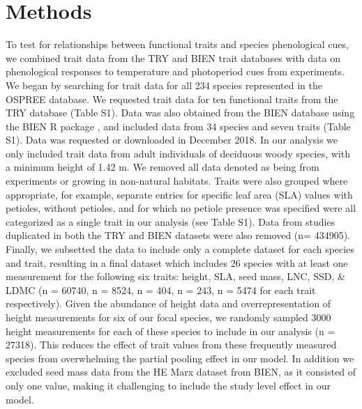 \documentclass{article}\usepackage[]{graphicx}\usepackage[]{color}
\begin{document}
\section{Methods}
To test for relationships between functional traits and species phenological cues, we combined trait data from the TRY and BIEN trait databases with data on phenological responses to temperature and photoperiod cues from experiments. We began by searching for trait data for all 234 species represented in the OSPREE database. We requested trait data for ten functional traits from the TRY database (Table S1). Data was also obtained from the BIEN database using the BIEN R package \citep{Maitner2017}, and included data from 34 species and seven traits (Table S1). Data was requested or downloaded in December 2018. In our analysis we only included trait data from adult individuals of deciduous woody species, with a minimum height of 1.42 m. We removed all data denoted as being from experiments or growing in non-natural habitats. Traits were also grouped where appropriate, for example, separate entries for specific leaf area (SLA) values with petioles, without petioles, and for which no petiole presence was specified were all categorized as a single trait in our analysis (see Table S1). Data from studies duplicated in both the TRY and BIEN datasets were also removed (n= 434905).  Finally, we subsetted the data to include only a complete dataset for each species and trait, resulting in a final dataset which includes 26 species with at least one measurement for the following six traits: height, SLA, seed mass, LNC, SSD, \& LDMC (n = 60740, n = 8524, n = 404, n = 243, n = 5474 for each trait respectively). Given the abundance of height data and overrepresentation of height measurements for six of our focal species, we randomly sampled 3000 height measurements for each of these species to include in our analysis (n = 27318). This reduces the effect of trait values from these frequently measured species from overwhelming the partial pooling effect in our model. In addition we excluded seed mass data from the HE Marx dataset from BIEN, as it consisted of only one value, making it challenging to include the study level effect in our model.%
\end{document}
